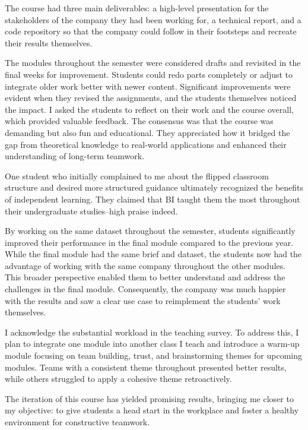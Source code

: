 \documentclass{article}
\begin{document}
The course had three main deliverables: a high-level presentation for the stakeholders of the company they had been working for, a technical report, and a code repository so that the company could follow in their footsteps and recreate their results themselves.

The modules throughout the semester were considered drafts and revisited in the final weeks for improvement. Students could redo parts completely or adjust to integrate older work better with newer content. Significant improvements were evident when they revised the assignments, and the students themselves noticed the impact. I asked the students to reflect on their work and the course overall, which provided valuable feedback. The consensus was that the course was demanding but also fun and educational. They appreciated how it bridged the gap from theoretical knowledge to real-world applications and enhanced their understanding of long-term teamwork.

One student who initially complained to me about the flipped classroom structure and desired more structured guidance ultimately recognized the benefits of independent learning. They claimed that BI taught them the most throughout their undergraduate studies--high praise indeed.

By working on the same dataset throughout the semester, students significantly improved their performance in the final module compared to the previous year. While the final module had the same brief and dataset, the students now had the advantage of working with the same company throughout the other modules. This broader perspective enabled them to better understand and address the challenges in the final module. Consequently, the company was much happier with the results and saw a clear use case to reimplement the students' work themselves.

I acknowledge the substantial workload in the teaching survey. To address this, I plan to integrate one module into another class I teach and introduce a warm-up module focusing on team building, trust, and brainstorming themes for upcoming modules. Teams with a consistent theme throughout presented better results, while others struggled to apply a cohesive theme retroactively.

The iteration of this course has yielded promising results, bringing me closer to my objective: to give students a head start in the workplace and foster a healthy environment for constructive teamwork.
\end{document}
